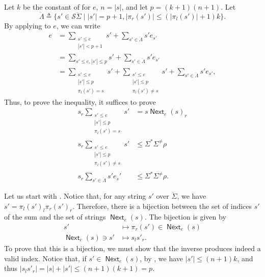 \documentclass[a4paper,UKenglish,cleveref, autoref, thm-restate]{lipics-v2021}
\DeclareMathOperator{\Next}{\mathsf{Next}}
\begin{document}
\begin{proofEnd}
  Let $k$ be the constant of  for $e$,
  $n = |s|$, and let $p = (k+1)(n+1)$. Let
  \[ \ddot{ \Lambda }  \triangleq  \{s'  \in  \mathcal{S}\ddot{ \Sigma }  \mid  |s'| =p+1, | \pi _r(s')|  \leq  (| \pi _l(s')| + 1)k \}.\] By
  applying  to $e$, we can write
  \begin{align*}
    e
    & =  \sum _{\substack{s'  \leq  e \\ |s'| < p+1}} s' + %
       \sum _{s'  \in  \ddot{ \Lambda }}s'e_{s'} \\
    & =  \sum _{s'  \leq  e, |s'|  \leq  p} s' + %
       \sum _{s'  \in  \ddot{ \Lambda }}s'e_{s'} \\
    & =  \sum _{\substack{s'  \leq  e \\ |s'|  \leq  p \\  \pi _l(s') = s}} s' + %
       \sum _{\substack{s'  \leq  e \\ |s'|  \leq  p \\  \pi _l(s')  \neq  s}} s' + %
       \sum _{s'  \in  \ddot{ \Lambda }} s' e_{s'},
  \end{align*}
  Thus, to prove the inequality, it suffices to prove
  \begin{align}
    s_r \sum _{\substack{s' \leq e \\ |s'|  \leq  p \\  \pi _l(s') = s}} s'
    & = s \Next_e(s)_r
      \label{eq:representable-goal-1} \\
    s_r \sum _{\substack{s' \leq e \\ |s'|  \leq  p \\  \pi _l(s')  \neq  s}} s'
    &  \leq   \Sigma ^* \Sigma ^{ \neq } \rho 
      \label{eq:representable-goal-2} \\
    s_r \sum _{s'  \in  \ddot{ \Lambda }}s'e_s'
    &  \leq   \Sigma ^* \Sigma ^{ \neq } \rho 
      \label{eq:representable-goal-3}.
  \end{align}

  Let us start with .  Notice that, for any
  string $s'$ over $\ddot{ \Sigma }$, we have $s' =  \pi _l(s')_l \pi _r(s')_r$.  Therefore,
  there is a bijection between the set of indices $s'$ of the sum and the set of
  strings $\Next_e(s)$.  The bijection is given by
  \begin{align*}
    s' &  \mapsto   \pi _r(s')  \in  \Next_e(s) \\
    \Next_e(s)  \ni  s' &  \mapsto  s_ls'_r.
  \end{align*}
  To prove that this is a bijection, we must show that the inverse produces
  indeed a valid index.  Notice that, if $s'  \in  \Next_e(s)$, by
  , we have $|s'|  \leq  (n+1)k$, and thus
  $|s_ls'_r| = |s|+|s'|  \leq  (n+1)(k+1) = p$.


\end{proofEnd}
\end{document}
